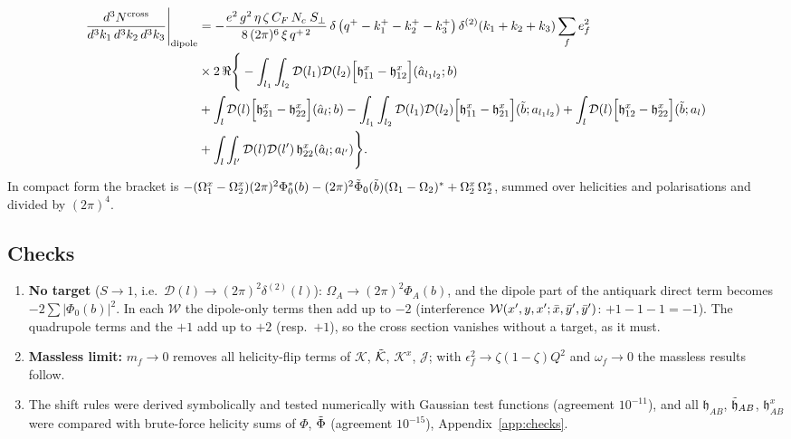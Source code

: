 \documentclass[9pt]{article}
\numberwithin{equation}{section}
\begin{document}
\begin{align}\label{eq:resx}
    \frac{d^{3}N^{\text{cross}}}{d^{3}k_{1}\,d^{3}k_{2}\, d^{3}k_{3}}\Bigg|_{\text{dipole}} & = -\frac{e^{2}\,g^{2}\,\eta\,\zeta\,C_{F}\,N_{c}\;S_{\perp}}{8\,(2\pi)^{6}\,\xi\,q^{+\,2}}\,\delta\left(q^{+}-k^{+}_{1}-k^{+}_{2}-k^{+}_{3}\right)\delta^{(2)}(k_{1}+k_{2}+k_{3})\sum_{f}e^{2}_{f}\notag \\
    & \times2\,\Re\Bigg\{-\int_{l_{1}}\int_{l_{2}}\mathcal{D}(l_{1})\mathcal{D}(l_{2})\Big[\mathfrak{h}^{x}_{11}-\mathfrak{h}^{x}_{12}\Big](\hat{a}_{l_{1}l_{2}};b)\notag \\
    & +\int_{l}\mathcal{D}(l)\Big[\mathfrak{h}^{x}_{21}-\mathfrak{h}^{x}_{22}\Big](\hat{a}_{l};b) - \int_{l_{1}}\int_{l_{2}}\mathcal{D}(l_{1})\mathcal{D}(l_{2})\Big[\mathfrak{h}^{x}_{11}-\mathfrak{h}^{x}_{21}\Big](\Tilde{b};a_{l_{1}l_{2}}) + \int_{l}\mathcal{D}(l)\Big[\mathfrak{h}^{x}_{12}-\mathfrak{h}^{x}_{22}\Big](\Tilde{b};a_{l})\notag \\
    & + \int_{l}\int_{l'}\mathcal{D}(l)\mathcal{D}(l')\,\mathfrak{h}^{x}_{22}(\hat{a}_{l};a_{l'})\Bigg\}.
\end{align}
In compact form the bracket is $-(\Omega^{x}_{1}-\Omega^{x}_{2})(2\pi)^{2}\Phi^{*}_{0}(b)-(2\pi)^{2}\Tilde{\Phi}_{0}(\Tilde{b})(\Omega_{1}-\Omega_{2})^{*}+\Omega^{x}_{2}\,\Omega^{*}_{2}$, summed over helicities and polarisations and divided by $(2\pi)^{4}$.

\subsection{Checks}
\begin{enumerate}
    \item \textbf{No target} ($S\rightarrow 1$, i.e.\ $\mathcal{D}(l)\rightarrow(2\pi)^{2}\delta^{(2)}(l)$): $\Omega_{A}\rightarrow(2\pi)^{2}\Phi_{A}(b)$, and the dipole part of the antiquark direct term becomes $-2\sum|\Phi_{0}(b)|^{2}$. In each $\mathcal{W}$ the dipole-only terms then add up to $-2$ (interference $\mathcal{W}(x',y,x';\Bar{x},\Bar{y}',\Bar{y}')$: $+1-1-1=-1$). The quadrupole terms and the $+1$ add up to $+2$ (resp.\ $+1$), so the cross section vanishes without a target, as it must.
    \item \textbf{Massless limit:} $m_{f}\rightarrow0$ removes all helicity-flip terms of $\mathcal{K}$, $\Tilde{\mathcal{K}}$, $\mathcal{K}^{x}$, $\mathcal{J}$; with $\epsilon^{2}_{f}\rightarrow\zeta(1-\zeta)Q^{2}$ and $\omega_{f}\rightarrow 0$ the massless results follow.
    \item The shift rules were derived symbolically and tested numerically with Gaussian test functions (agreement $10^{-11}$), and all $\mathfrak{h}_{AB}$, $\Tilde{\mathfrak{h}}_{AB}$, $\mathfrak{h}^{x}_{AB}$ were compared with brute-force helicity sums of $\Phi$, $\Tilde{\Phi}$ (agreement $10^{-15}$), Appendix~\ref{app:checks}.
\end{enumerate}
\end{document}
